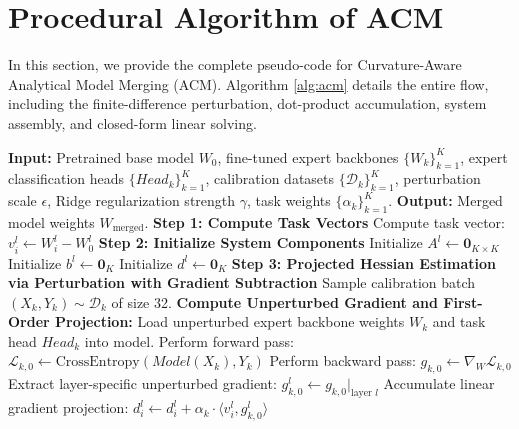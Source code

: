 \section{Procedural Algorithm of ACM}
\label{app:algorithm}

In this section, we provide the complete pseudo-code for Curvature-Aware Analytical Model Merging (ACM). Algorithm \ref{alg:acm} details the entire flow, including the finite-difference perturbation, dot-product accumulation, system assembly, and closed-form linear solving.

\begin{algorithm}[htbp]
\caption{Curvature-Aware Analytical Model Merging (ACM)}
\label{alg:acm}
\begin{small}
\begin{algorithmic}[1]
\STATE \textbf{Input:} Pretrained base model $W_0$, fine-tuned expert backbones $\{W_k\}_{k=1}^K$, expert classification heads $\{Head_k\}_{k=1}^K$, calibration datasets $\{\mathcal{D}_k\}_{k=1}^K$, perturbation scale $\epsilon$, Ridge regularization strength $\gamma$, task weights $\{\alpha_k\}_{k=1}^K$.
\STATE \textbf{Output:} Merged model weights $W_{\text{merged}}$.
\STATE
\STATE \textbf{Step 1: Compute Task Vectors}
        \STATE Compute task vector: $v_i^l \leftarrow W_i^l - W_0^l$
    \ENDFOR
\ENDFOR
\STATE
\STATE \textbf{Step 2: Initialize System Components}
    \STATE Initialize $A^l \leftarrow \mathbf{0}_{K \times K}$
    \STATE Initialize $b^l \leftarrow \mathbf{0}_{K}$
    \STATE Initialize $d^l \leftarrow \mathbf{0}_{K}$
\ENDFOR
\STATE
\STATE \textbf{Step 3: Projected Hessian Estimation via Perturbation with Gradient Subtraction}
    \STATE Sample calibration batch $(X_k, Y_k) \sim \mathcal{D}_k$ of size 32.
    \STATE \textbf{Compute Unperturbed Gradient and First-Order Projection:}
    \STATE Load unperturbed expert backbone weights $W_k$ and task head $Head_k$ into model.
    \STATE Perform forward pass: $\mathcal{L}_{k,0} \leftarrow \text{CrossEntropy}(Model(X_k), Y_k)$
    \STATE Perform backward pass: $g_{k,0} \leftarrow \nabla_W \mathcal{L}_{k,0}$
            \STATE Extract layer-specific unperturbed gradient: $g_{k,0}^l \leftarrow g_{k,0}|_{\text{layer } l}$
            \STATE Accumulate linear gradient projection: $d^l_i \leftarrow d^l_i + \alpha_k \cdot \langle v_i^l, g_{k,0}^l \rangle$

\end{algorithmic}
\end{small}
\end{algorithm}
